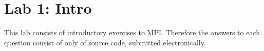 \section{Lab 1: Intro}

This lab consists of introductory exercises to MPI. Therefore the answers to each question consist of only of source code, submitted electronically.